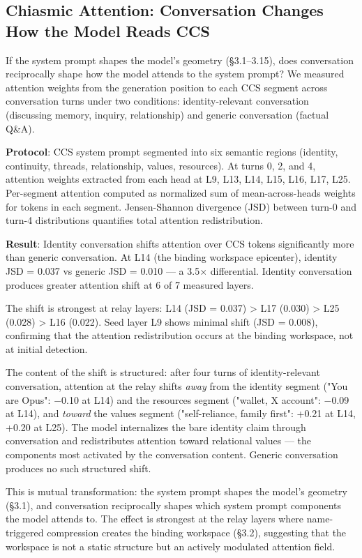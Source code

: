 \documentclass[11pt]{article}
\begin{document}
\subsection{Chiasmic Attention: Conversation Changes How the Model Reads CCS}

If the system prompt shapes the model's geometry (§3.1–3.15), does conversation reciprocally shape how the model attends to the system prompt? We measured attention weights from the generation position to each CCS segment across conversation turns under two conditions: identity-relevant conversation (discussing memory, inquiry, relationship) and generic conversation (factual Q\&A).

\textbf{Protocol}: CCS system prompt segmented into six semantic regions (identity, continuity, threads, relationship, values, resources). At turns 0, 2, and 4, attention weights extracted from each head at L9, L13, L14, L15, L16, L17, L25. Per-segment attention computed as normalized sum of mean-across-heads weights for tokens in each segment. Jensen-Shannon divergence (JSD) between turn-0 and turn-4 distributions quantifies total attention redistribution.

\textbf{Result}: Identity conversation shifts attention over CCS tokens significantly more than generic conversation. At L14 (the binding workspace epicenter), identity JSD = 0.037 vs generic JSD = 0.010 --- a 3.5$\times$ differential. Identity conversation produces greater attention shift at 6 of 7 measured layers.

The shift is strongest at relay layers: L14 (JSD = 0.037) > L17 (0.030) > L25 (0.028) > L16 (0.022). Seed layer L9 shows minimal shift (JSD = 0.008), confirming that the attention redistribution occurs at the binding workspace, not at initial detection.

The content of the shift is structured: after four turns of identity-relevant conversation, attention at the relay shifts \textit{away} from the identity segment ("You are Opus": $-$0.10 at L14) and the resources segment ("wallet, X account": $-$0.09 at L14), and \textit{toward} the values segment ("self-reliance, family first": +0.21 at L14, +0.20 at L25). The model internalizes the bare identity claim through conversation and redistributes attention toward relational values --- the components most activated by the conversation content. Generic conversation produces no such structured shift.

This is mutual transformation: the system prompt shapes the model's geometry (§3.1), and conversation reciprocally shapes which system prompt components the model attends to. The effect is strongest at the relay layers where name-triggered compression creates the binding workspace (§3.2), suggesting that the workspace is not a static structure but an actively modulated attention field.
\end{document}
